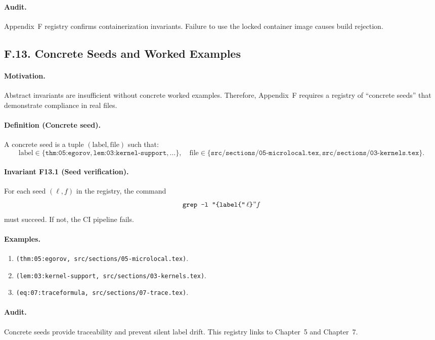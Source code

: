 \paragraph{Audit.} Appendix~F registry confirms containerization invariants. Failure to use the locked container image causes build rejection.

\subsection*{F.13. Concrete Seeds and Worked Examples}

\paragraph{Motivation.} Abstract invariants are insufficient without concrete worked examples. Therefore, Appendix~F requires a registry of “concrete seeds” that demonstrate compliance in real files.

\paragraph{Definition (Concrete seed).} A concrete seed is a tuple $(\text{label}, \text{file})$ such that:
\[
\text{label} \in \{\texttt{thm:05:egorov}, \texttt{lem:03:kernel-support}, \dots\}, \quad
\text{file} \in \{\texttt{src/sections/05-microlocal.tex}, \texttt{src/sections/03-kernels.tex}\}.
\]

\paragraph{Invariant F13.1 (Seed verification).} For each seed $(\ell,f)$ in the registry, the command
\[
\texttt{grep -l "\{label\{"}\,\ell\texttt{\}}" f
\]
must succeed. If not, the CI pipeline fails.

\paragraph{Examples.} 
\begin{enumerate}
    \item \texttt{(thm:05:egorov, src/sections/05-microlocal.tex)}.
    \item \texttt{(lem:03:kernel-support, src/sections/03-kernels.tex)}.
    \item \texttt{(eq:07:traceformula, src/sections/07-trace.tex)}.
\end{enumerate}

\paragraph{Audit.} Concrete seeds provide traceability and prevent silent label drift. This registry links to Chapter~5 and Chapter~7.

